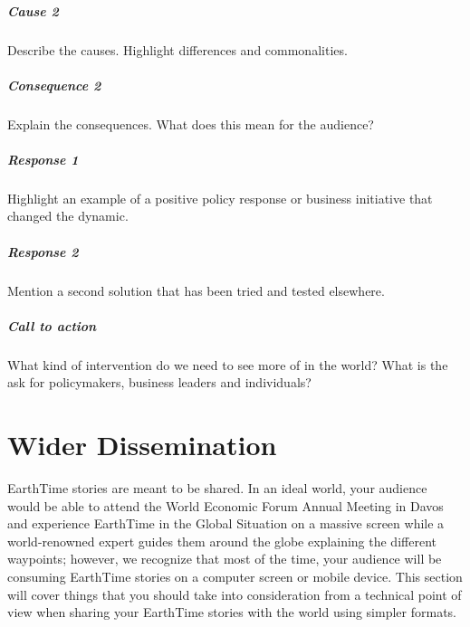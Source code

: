 \documentclass[
  12pt,
]{krantz}
\renewenvironment{quote}{\begin{VF}}{\end{VF}}
\begin{document}
\hypertarget{cause-2}{%
\subparagraph*{Cause 2}\label{cause-2}}

\begin{quote}
Describe the causes. Highlight differences and commonalities.
\end{quote}

\hypertarget{consequence-2}{%
\subparagraph*{Consequence 2}\label{consequence-2}}

\begin{quote}
Explain the consequences. What does this mean for the audience?
\end{quote}

\hypertarget{response-1}{%
\subparagraph*{Response 1}\label{response-1}}

\begin{quote}
Highlight an example of a positive policy response or business initiative that changed the dynamic.
\end{quote}

\hypertarget{response-2}{%
\subparagraph*{Response 2}\label{response-2}}

\begin{quote}
Mention a second solution that has been tried and tested elsewhere.
\end{quote}

\hypertarget{call-to-action}{%
\subparagraph*{Call to action}\label{call-to-action}}

\begin{quote}
What kind of intervention do we need to see more of in the world? What is the ask for policymakers, business leaders and individuals?
\end{quote}

\hypertarget{wider-dissemination}{%
\section{Wider Dissemination}\label{wider-dissemination}}

EarthTime stories are meant to be shared. In an ideal world, your audience would be able to attend the World Economic Forum Annual Meeting in Davos and experience EarthTime in the Global Situation on a massive screen while a world-renowned expert guides them around the globe explaining the different waypoints; however, we recognize that most of the time, your audience will be consuming EarthTime stories on a computer screen or mobile device. This section will cover things that you should take into consideration from a technical point of view when sharing your EarthTime stories with the world using simpler formats.
\end{document}
